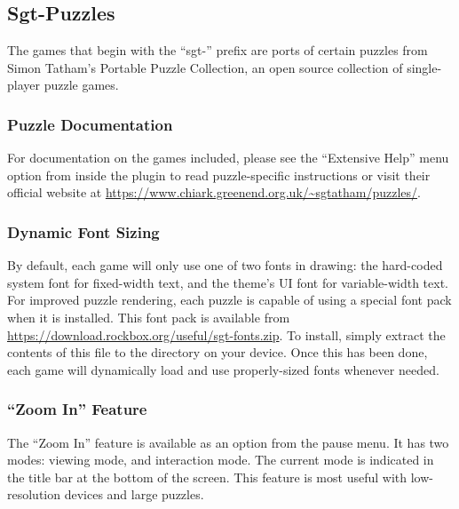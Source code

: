 \subsection{Sgt-Puzzles}

The games that begin with the ``sgt-'' prefix are ports of certain
puzzles from Simon Tatham's Portable Puzzle Collection, an open source
collection of single-player puzzle games.


\subsubsection{Puzzle Documentation}
For documentation on the games included, please see the ``Extensive
Help'' menu option from inside the plugin to read puzzle-specific
instructions or visit their official website at
\url{https://www.chiark.greenend.org.uk/~sgtatham/puzzles/}.

\subsubsection{Dynamic Font Sizing}
By default, each game will only use one of two fonts in drawing: the
hard-coded system font for fixed-width text, and the theme's UI font
for variable-width text. For improved puzzle rendering, each puzzle is
capable of using a special font pack when it is installed. This font
pack is available from
\url{https://download.rockbox.org/useful/sgt-fonts.zip}. To install,
simply extract the contents of this file to the
 directory on your device. Once this has been
done, each game will dynamically load and use properly-sized fonts
whenever needed.


\subsubsection{``Zoom In'' Feature}
The ``Zoom In'' feature is available as an option from the pause
menu. It has two modes: viewing mode, and interaction mode. The
current mode is indicated in the title bar at the bottom of the
screen. This feature is most useful with low-resolution devices and
large puzzles.

